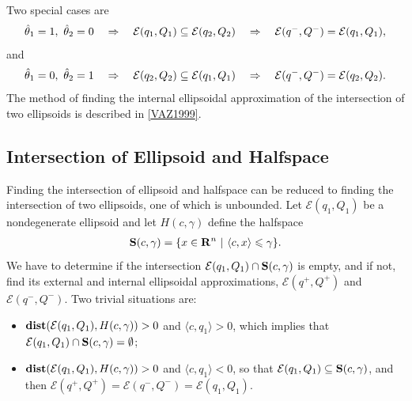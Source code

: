\documentclass[letterpaper,10pt,english]{sphinxmanual}
\begin{document}
Two special cases are
\begin{gather}
\begin{split}\hat{\theta}_1=1, ~ \hat{\theta}_2=0 ~~~ \Rightarrow ~~~
{\mathcal E}(q_1,Q_1)\subseteq{\mathcal E}(q_2,Q_2) ~~~ \Rightarrow ~~~
{\mathcal E}(q^-,Q^-)={\mathcal E}(q_1,Q_1),\end{split}\notag
\end{gather}
and
\begin{gather}
\begin{split}\hat{\theta}_1=0, ~ \hat{\theta}_2=1 ~~~ \Rightarrow ~~~
{\mathcal E}(q_2,Q_2)\subseteq{\mathcal E}(q_1,Q_1) ~~~ \Rightarrow ~~~
{\mathcal E}(q^-,Q^-)={\mathcal E}(q_2,Q_2).\end{split}\notag
\end{gather}
The method of finding the internal ellipsoidal approximation of the
intersection of two ellipsoids is described in {\hyperref[chap_ellcalc:vaz1999]{{[}VAZ1999{]}}}.


\subsection{Intersection of Ellipsoid and Halfspace}
\label{chap_ellcalc:intersection-of-ellipsoid-and-halfspace}
Finding the intersection of ellipsoid and halfspace can be reduced to
finding the intersection of two ellipsoids, one of which is unbounded.
Let \({\mathcal E}(q_1,Q_1)\) be a nondegenerate ellipsoid and let
\(H(c,\gamma)\) define the halfspace
\begin{gather}
\begin{split}{\bf S}(c,\gamma) = \{x\in{\bf R}^n ~|~ \langle c,x\rangle\leqslant\gamma\}.\end{split}\notag
\end{gather}
We have to determine if the intersection
\({\mathcal E}(q_1,Q_1)\cap{\bf S}(c,\gamma)\) is empty, and if not,
find its external and internal ellipsoidal approximations,
\({\mathcal E}(q^+,Q^+)\) and \({\mathcal E}(q^-,Q^-)\). Two
trivial situations are:
\begin{itemize}
\item {} 
\({\bf dist}({\mathcal E}(q_1,Q_1),H(c,\gamma))>0\) and
\(\langle c, q_1\rangle>0\), which implies that
\({\mathcal E}(q_1,Q_1)\cap{\bf S}(c,\gamma)=\emptyset\);

\item {} 
\({\bf dist}({\mathcal E}(q_1,Q_1),H(c,\gamma))>0\) and
\(\langle c, q_1\rangle<0\), so that
\({\mathcal E}(q_1,Q_1)\subseteq{\bf S}(c,\gamma)\), and then
\({\mathcal E}(q^+,Q^+)={\mathcal E}(q^-,Q^-)={\mathcal E}(q_1,Q_1)\).

\end{itemize}
\end{document}
